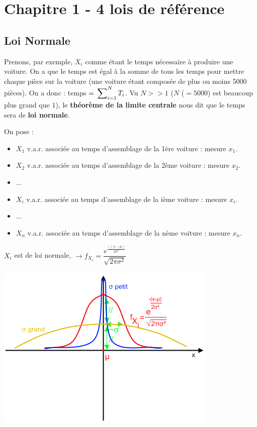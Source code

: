 \documentclass{article}
\begin{document}
\section{Chapitre 1 - 4 lois de référence}

\subsection{Loi Normale}

Prenons, par exemple, $X_i$ comme étant le temps nécessaire à produire une voiture. On a que le temps est égal à la somme
de tous les temps pour mettre chaque pièce sur la voiture (une voiture étant composée de plus ou moins 5000 pièces). On a 
donc : temps $=\sideset{}{^N_{i=1}}\sum{T_i} $. Vu $N >> 1$ ($N$ ($=5000$) est beaucoup plus grand que $1$), le 
\textbf{théorème de la limite centrale} nous dit que le temps sera de \textbf{loi normale}.

On pose : 
\begin{itemize}
 \item $X_1$ v.a.r. associée au temps d'assemblage de la 1ère voiture : mesure $x_1$.
 \item $X_2$ v.a.r. associée au temps d'assemblage de la 2ème voiture : mesure $x_2$.
 \item ...
 \item $X_i$ v.a.r. associée au temps d'assemblage de la ième voiture : mesure $x_i$.
 \item ...
 \item $X_n$ v.a.r. associée au temps d'assemblage de la nème voiture : mesure $x_n$.
\end{itemize}

$X_i$ est de loi normale, $\rightarrow f_{X_i} = \dfrac{e^{\frac{-(x-\mu)}{2\sigma^2}}}
                                                           {\sqrt{2\pi\sigma^2}}$

\includegraphics{Figure1-1.png}
\end{document}
